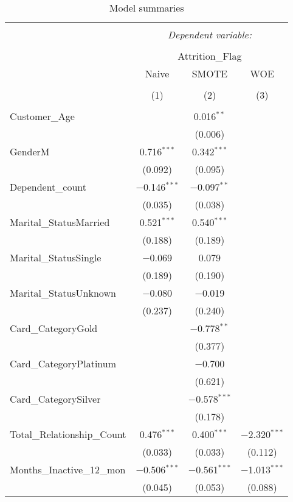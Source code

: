 \begin{table}[!htbp] \centering 
  \caption{Model summaries} 
  \label{tab:Models} 
\scriptsize 
\begin{tabular}{@{\extracolsep{5pt}}lccc} 
\\[-1.8ex]\hline 
\hline \\[-1.8ex] 
 & \multicolumn{3}{c}{\textit{Dependent variable:}} \\ 
\cline{2-4} 
\\[-1.8ex] & \multicolumn{3}{c}{Attrition\_Flag} \\ 
 & Naive & SMOTE & WOE \\ 
\\[-1.8ex] & (1) & (2) & (3)\\ 
\hline \\[-1.8ex] 
 Customer\_Age &  & 0.016$^{**}$ &  \\ 
  &  & (0.006) &  \\ 
  GenderM & 0.716$^{***}$ & 0.342$^{***}$ &  \\ 
  & (0.092) & (0.095) &  \\ 
  Dependent\_count & $-$0.146$^{***}$ & $-$0.097$^{**}$ &  \\ 
  & (0.035) & (0.038) &  \\ 
  Marital\_StatusMarried & 0.521$^{***}$ & 0.540$^{***}$ &  \\ 
  & (0.188) & (0.189) &  \\ 
  Marital\_StatusSingle & $-$0.069 & 0.079 &  \\ 
  & (0.189) & (0.190) &  \\ 
  Marital\_StatusUnknown & $-$0.080 & $-$0.019 &  \\ 
  & (0.237) & (0.240) &  \\ 
  Card\_CategoryGold &  & $-$0.778$^{**}$ &  \\ 
  &  & (0.377) &  \\ 
  Card\_CategoryPlatinum &  & $-$0.700 &  \\ 
  &  & (0.621) &  \\ 
  Card\_CategorySilver &  & $-$0.578$^{***}$ &  \\ 
  &  & (0.178) &  \\ 
  Total\_Relationship\_Count & 0.476$^{***}$ & 0.400$^{***}$ & $-$2.320$^{***}$ \\ 
  & (0.033) & (0.033) & (0.112) \\ 
  Months\_Inactive\_12\_mon & $-$0.506$^{***}$ & $-$0.561$^{***}$ & $-$1.013$^{***}$ \\ 
  & (0.045) & (0.053) & (0.088) \\ 

\end{tabular}
\end{table}
